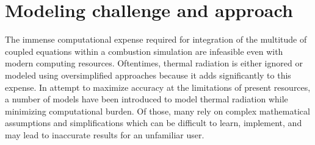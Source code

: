 









\section{Modeling challenge and approach}
The immense computational expense required for integration of the multitude of coupled equations within a combustion simulation are infeasible even with modern computing resources. Oftentimes, thermal radiation is either ignored or modeled using oversimplified approaches because it adds significantly to this expense.
In attempt to maximize accuracy at the limitations of present resources, a number of models have been introduced to model thermal radiation while minimizing computational burden.
Of those, many rely on complex mathematical assumptions and simplifications which can be difficult to learn, implement, and may lead to inaccurate results for an unfamiliar user. 


